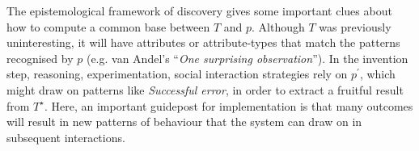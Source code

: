 The epistemological framework of discovery gives some important clues
about how to compute a common base between $T$ and $p$.  Although $T$
was previously uninteresting, it will have attributes or
attribute-types that match the patterns recognised by $p$ (e.g. van
Andel's ``\emph{One surprising observation}'').  In the invention
step, reasoning, experimentation, social interaction strategies rely
on $p^{\prime}$, which might draw on patterns like \emph{Successful
  error}, in order to extract a fruitful result from $T^{\star}$.
Here, an important guidepost for implementation is that many outcomes
will result in new patterns of behaviour that the system can draw on
in subsequent interactions.

